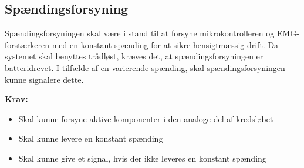 \subsection{Spændingsforsyning} \label{sec:krav_spaending}
Spændingsforsyningen skal være i stand til at forsyne mikrokontrolleren og EMG-forstærkeren med en konstant spænding for at sikre hensigtmæssig drift. 
Da systemet skal benyttes trådløst, kræves det, at spændingsforsyningen er batteridrevet. 
I tilfælde af en varierende spænding, skal spændingsforsyningen kunne signalere dette. 


\vspace{3mm}
\textbf{Krav:}
\begin{itemize} 
\item Skal kunne forsyne aktive komponenter i den analoge del af kredsløbet
\item Skal kunne levere en konstant spænding
\item Skal kunne give et signal, hvis der ikke leveres en konstant spænding 
\end{itemize}
